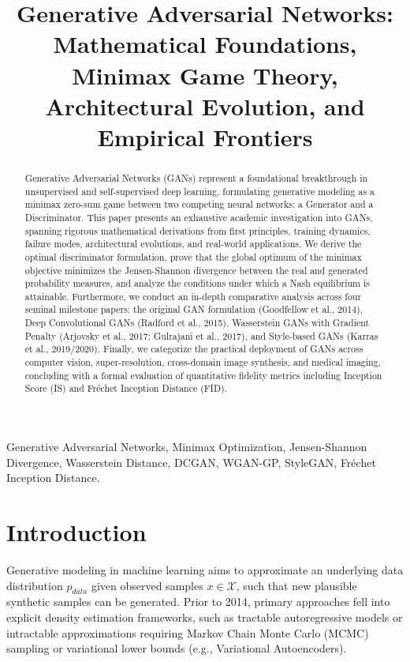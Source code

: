 \documentclass[conference]{IEEEtran}
\begin{document}
\title{Generative Adversarial Networks: Mathematical Foundations, Minimax Game Theory, Architectural Evolution, and Empirical Frontiers}

\maketitle

\begin{abstract}
Generative Adversarial Networks (GANs) represent a foundational breakthrough in unsupervised and self-supervised deep learning, formulating generative modeling as a minimax zero-sum game between two competing neural networks: a Generator and a Discriminator. This paper presents an exhaustive academic investigation into GANs, spanning rigorous mathematical derivations from first principles, training dynamics, failure modes, architectural evolutions, and real-world applications. We derive the optimal discriminator formulation, prove that the global optimum of the minimax objective minimizes the Jensen-Shannon divergence between the real and generated probability measures, and analyze the conditions under which a Nash equilibrium is attainable. Furthermore, we conduct an in-depth comparative analysis across four seminal milestone papers: the original GAN formulation (Goodfellow et al., 2014), Deep Convolutional GANs (Radford et al., 2015), Wasserstein GANs with Gradient Penalty (Arjovsky et al., 2017; Gulrajani et al., 2017), and Style-based GANs (Karras et al., 2019/2020). Finally, we categorize the practical deployment of GANs across computer vision, super-resolution, cross-domain image synthesis, and medical imaging, concluding with a formal evaluation of quantitative fidelity metrics including Inception Score (IS) and Fr\'echet Inception Distance (FID).
\end{abstract}

\begin{IEEEkeywords}
Generative Adversarial Networks, Minimax Optimization, Jensen-Shannon Divergence, Wasserstein Distance, DCGAN, WGAN-GP, StyleGAN, Fr\'echet Inception Distance.
\end{IEEEkeywords}

\section{Introduction}
Generative modeling in machine learning aims to approximate an underlying data distribution $p_{data}$ given observed samples $x \in \mathcal{X}$, such that new plausible synthetic samples can be generated. Prior to 2014, primary approaches fell into explicit density estimation frameworks, such as tractable autoregressive models or intractable approximations requiring Markov Chain Monte Carlo (MCMC) sampling or variational lower bounds (e.g., Variational Autoencoders).
\end{document}
